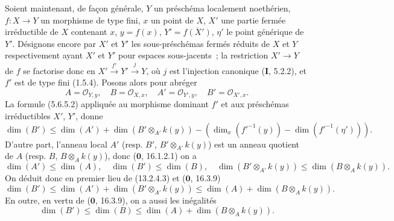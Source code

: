 \begin{env}[13.2.4]
\label{IV.13.2.4-fr}
Soient maintenant, de façon générale, $Y$ un préschéma localement noethérien,
$f:X\to Y$ un morphisme de type fini, $x$ un point de $X$, $X'$ une partie
fermée irréductible de $X$ contenant $x$, $y=f(x)$,
$Y'=\overline{f(X')}$, $\eta'$ le point générique de $Y'$. Désignons encore
par $X'$ et $Y'$ les sous-préschémas fermés réduits de $X$ et $Y$
respectivement ayant $X'$ et $Y'$ pour espaces sous-jacents~; la restriction
$X'\to Y$ de $f$ se factorise donc en
$X'\xrightarrow{f'}Y'\xrightarrow{j}Y$, où $j$ est l'injection canonique
(\textbf{I}, 5.2.2), et $f'$ est de type fini (1.5.4). Posons alors pour
abréger
\[
\tag{13.2.4.1}
\label{IV.13.2.4.1-fr}
  A=\mathcal O_{Y,y},\quad B=\mathcal O_{X,x},\quad
  A'=\mathcal O_{Y',y},\quad B'=\mathcal O_{X',x}.
\]
La formule (5.6.5.2) appliquée au morphisme dominant $f'$ et aux préschémas
irréductibles $X'$, $Y'$, donne
\[
\tag{13.2.4.2}
\label{IV.13.2.4.2-fr}
  \dim(B')\leq\dim(A')+\dim(B'\otimes_{A'}k(y))
  -(\dim_x(f'^{-1}(y))-\dim(f'^{-1}(\eta'))).
\]
D'autre part, l'anneau local $A'$ (resp. $B'$, $B'\otimes_{A'}k(y)$) est un
anneau quotient de $A$ (resp. $B$, $B\otimes_Ak(y)$), donc
($\mathbf 0$, 16.1.2.1) on a
\[
\tag{13.2.4.3}
\label{IV.13.2.4.3-fr}
  \dim(A')\leq\dim(A),\quad \dim(B')\leq\dim(B),\quad
  \dim(B'\otimes_{A'}k(y))\leq\dim(B\otimes_Ak(y)).
\]
On déduit donc en premier lieu de (13.2.4.3) et ($\mathbf 0$, 16.3.9)
\[
\tag{13.2.4.4}
\label{IV.13.2.4.4-fr}
  \dim(B')\leq\dim(A')+\dim(B'\otimes_{A'}k(y))
  \leq\dim(A)+\dim(B\otimes_Ak(y)).
\]
En outre, en vertu de ($\mathbf 0$, 16.3.9), on a aussi les inégalités
\[
\tag{13.2.4.5}
\label{IV.13.2.4.5-fr}
  \dim(B')\leq\dim(B)\leq\dim(A)+\dim(B\otimes_Ak(y)).
\]
\end{env}

